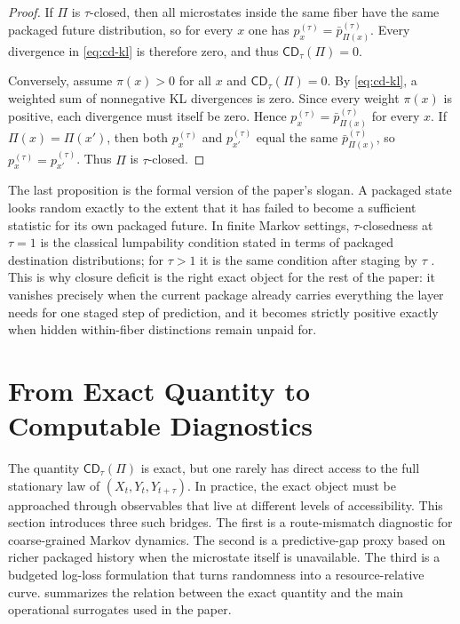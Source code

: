\documentclass[11pt]{article}
\numberwithin{equation}{section}
\begin{document}
\begin{proof}
If $\Pi$ is $\tau$-closed, then all microstates inside the same fiber have the same packaged future distribution, so for every $x$ one has $p_x^{(\tau)}=\bar p_{\Pi(x)}^{(\tau)}$. Every divergence in \eqref{eq:cd-kl} is therefore zero, and thus $\mathsf{CD}_\tau(\Pi)=0$.

Conversely, assume $\pi(x)>0$ for all $x$ and $\mathsf{CD}_\tau(\Pi)=0$. By \eqref{eq:cd-kl}, a weighted sum of nonnegative KL divergences is zero. Since every weight $\pi(x)$ is positive, each divergence must itself be zero. Hence $p_x^{(\tau)}=\bar p_{\Pi(x)}^{(\tau)}$ for every $x$. If $\Pi(x)=\Pi(x')$, then both $p_x^{(\tau)}$ and $p_{x'}^{(\tau)}$ equal the same $\bar p_{\Pi(x)}^{(\tau)}$, so $p_x^{(\tau)}=p_{x'}^{(\tau)}$. Thus $\Pi$ is $\tau$-closed.
\end{proof}

The last proposition is the formal version of the paper's slogan. A packaged state looks random exactly to the extent that it has failed to become a sufficient statistic for its own packaged future. In finite Markov settings, $\tau$-closedness at $\tau=1$ is the classical lumpability condition stated in terms of packaged destination distributions; for $\tau>1$ it is the same condition after staging by $\tau$ \citep{kemeny1976finitemarkovchains,buchholz1994exactordinarylumpability}. This is why closure deficit is the right exact object for the rest of the paper: it vanishes precisely when the current package already carries everything the layer needs for one staged step of prediction, and it becomes strictly positive exactly when hidden within-fiber distinctions remain unpaid for.
 \section{From Exact Quantity to Computable Diagnostics}\label{sec:diagnostics}

The quantity $\mathsf{CD}_\tau(\Pi)$ is exact, but one rarely has direct access to the full stationary law of $(X_t,Y_t,Y_{t+\tau})$. In practice, the exact object must be approached through observables that live at different levels of accessibility. This section introduces three such bridges. The first is a route-mismatch diagnostic for coarse-grained Markov dynamics. The second is a predictive-gap proxy based on richer packaged history when the microstate itself is unavailable. The third is a budgeted log-loss formulation that turns randomness into a resource-relative curve.  summarizes the relation between the exact quantity and the main operational surrogates used in the paper.
\end{document}
